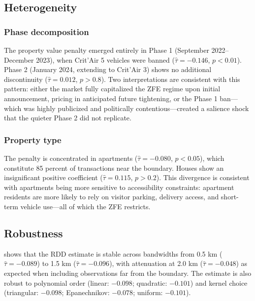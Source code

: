 \documentclass[12pt]{article}
\begin{document}
\subsection{Heterogeneity}



\subsubsection*{Phase decomposition} The property value penalty emerged entirely in Phase 1 (September 2022--December 2023), when Crit'Air 5 vehicles were banned ($\hat\tau = -0.146$, $p < 0.01$). Phase 2 (January 2024, extending to Crit'Air 3) shows no additional discontinuity ($\hat\tau = 0.012$, $p > 0.8$). Two interpretations are consistent with this pattern: either the market fully capitalized the ZFE regime upon initial announcement, pricing in anticipated future tightening, or the Phase 1 ban---which was highly publicized and politically contentious---created a salience shock that the quieter Phase 2 did not replicate.

\subsubsection*{Property type} The penalty is concentrated in apartments ($\hat\tau = -0.080$, $p < 0.05$), which constitute 85 percent of transactions near the boundary. Houses show an insignificant positive coefficient ($\hat\tau = 0.115$, $p > 0.2$). This divergence is consistent with apartments being more sensitive to accessibility constraints: apartment residents are more likely to rely on visitor parking, delivery access, and short-term vehicle use---all of which the ZFE restricts.

\subsection{Robustness}



 shows that the RDD estimate is stable across bandwidths from 0.5 km ($\hat\tau = -0.089$) to 1.5 km ($\hat\tau = -0.096$), with attenuation at 2.0 km ($\hat\tau = -0.048$) as expected when including observations far from the boundary. The estimate is also robust to polynomial order (linear: $-0.098$; quadratic: $-0.101$) and kernel choice (triangular: $-0.098$; Epanechnikov: $-0.078$; uniform: $-0.101$).


\end{document}
